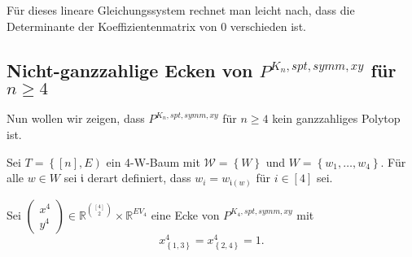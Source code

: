 \documentclass[10p,a4paper,BCOR = 12mm, DIV=15]{scrbook}
\begin{document}
{\begin{bew}
Für dieses lineare Gleichungssystem rechnet man leicht nach, dass die Determinante der Koeffizientenmatrix von $0$ verschieden ist.
\end{bew}

\subsection{Nicht-ganzzahlige Ecken von $P^{K_n, spt, symm, xy}$ für $n \geq 4$}

Nun wollen wir zeigen, dass $P^{K_n, spt, symm, xy}$ für $n \geq 4$ kein ganzzahliges Polytop ist.

\begin{Sa}
\label{sa:P_p^symm, xy_nichtganzz}
Sei $T=\left\{\left[n\right], E\right)$ ein 4-W-Baum mit $\mathcal{W} = \left\{W\right\}$ und $W = \left\{w_1, \ldots, w_4\right\}$. Für alle $w \in W$ sei $\mathfrak{i}$ derart definiert, dass $w_i = w_{\mathfrak{i}\left(w\right)}$ für $i \in \left[4\right]$ sei.

Sei $\left(
\begin{array}{c}
x^4 \\
y^4
\end{array}
\right) \in \mathbb{R}^{\left[4\right] \choose 2} \times \mathbb{R}^{EV_4}$ eine Ecke von $P^{K_4, spt, symm, xy}$  mit
\begin{displaymath}
x^4_{\left\{1, 3\right\}} = x^4_{\left\{2, 4\right\}} = 1.
\end{displaymath}


\end{Sa}}
\end{document}

